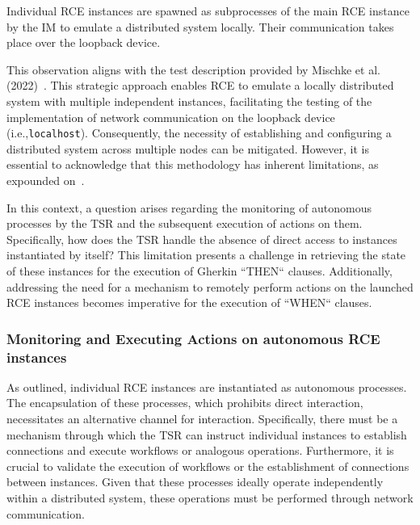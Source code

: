 \begin{observation}
Individual \ac{RCE} instances are spawned as subprocesses of the main \ac{RCE} instance by the \acl{IM} to emulate a distributed system locally. Their communication takes place over the loopback device.
\end{observation}

This observation aligns with the test description provided by Mischke et al. (2022)~\cite{10.1007/978-3-031-08760-8_44}. This strategic approach enables \ac{RCE} to emulate a locally distributed system with multiple independent instances, facilitating the testing of the implementation of network communication on the loopback device (i.e.,\texttt{localhost}). Consequently, the necessity of establishing and configuring a distributed system across multiple nodes can be mitigated. However, it is essential to acknowledge that this methodology has inherent limitations, as expounded on~.

In this context, a question arises regarding the monitoring of autonomous processes by the \ac{TSR} and the subsequent execution of actions on them. Specifically, how does the \ac{TSR} handle the absence of direct access to instances instantiated by itself? This limitation presents a challenge in retrieving the state of these instances for the execution of Gherkin ``THEN`` clauses. Additionally, addressing the need for a mechanism to remotely perform actions on the launched RCE instances becomes imperative for the execution of ``WHEN`` clauses.

\subsubsection{Monitoring and Executing Actions on autonomous RCE instances}
As outlined, individual RCE instances are instantiated as autonomous processes. The encapsulation of these processes, which prohibits direct interaction, necessitates an alternative channel for interaction. Specifically, there must be a mechanism through which the \ac{TSR} can instruct individual instances to establish connections and execute workflows or analogous operations. Furthermore, it is crucial to validate the execution of workflows or the establishment of connections between instances. Given that these processes ideally operate independently within a distributed system, these operations must be performed through network communication.

